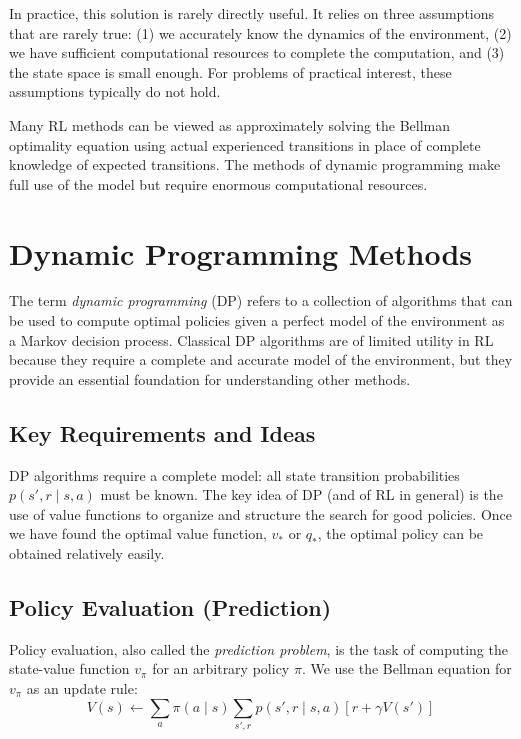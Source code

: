 \documentclass[12pt]{article}
\begin{document}
In practice, this solution is rarely directly useful. It relies on three assumptions that are rarely true: (1) we accurately know the dynamics of the environment, (2) we have sufficient computational resources to complete the computation, and (3) the state space is small enough. For problems of practical interest, these assumptions typically do not hold.

Many RL methods can be viewed as approximately solving the Bellman optimality equation using actual experienced transitions in place of complete knowledge of expected transitions. The methods of dynamic programming make full use of the model but require enormous computational resources.

\section{Dynamic Programming Methods}

The term \textit{dynamic programming} (DP) refers to a collection of algorithms that can be used to compute optimal policies given a perfect model of the environment as a Markov decision process. Classical DP algorithms are of limited utility in RL because they require a complete and accurate model of the environment, but they provide an essential foundation for understanding other methods.

\subsection{Key Requirements and Ideas}

DP algorithms require a complete model: all state transition probabilities $p(s', r \mid s, a)$ must be known. The key idea of DP (and of RL in general) is the use of value functions to organize and structure the search for good policies. Once we have found the optimal value function, $v_*$ or $q_*$, the optimal policy can be obtained relatively easily.

\subsection{Policy Evaluation (Prediction)}

Policy evaluation, also called the \textit{prediction problem}, is the task of computing the state-value function $v_\pi$ for an arbitrary policy $\pi$. We use the Bellman equation for $v_\pi$ as an update rule:
\begin{equation}
V(s) \leftarrow \sum_a \pi(a \mid s) \sum_{s', r} p(s', r \mid s, a)[r + \gamma V(s')]
\end{equation}
\end{document}
